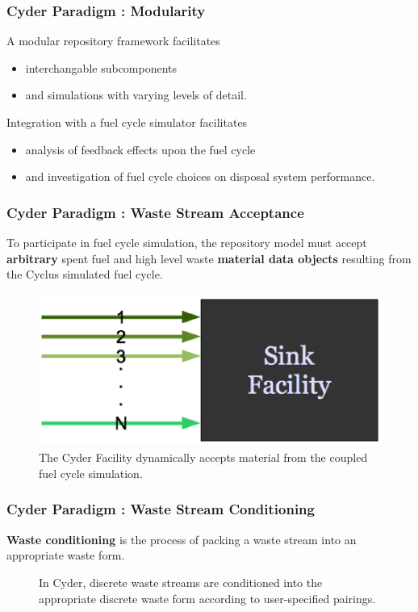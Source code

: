 
\begin{frame}[ctb!]
  \frametitle{Cyder Paradigm : Modularity }
  A modular repository framework facilitates 
  \begin{itemize}
    \item  interchangable subcomponents 
    \item and simulations with varying levels of detail.
  \end{itemize}
 \pause
  Integration with a fuel cycle simulator facilitates
  \begin{itemize}
    \item analysis of feedback effects upon the fuel cycle
    \item and investigation of fuel cycle choices on disposal system 
      performance.
  \end{itemize}
\end{frame}


\begin{frame}[ctb!]
  \frametitle{Cyder Paradigm : Waste Stream Acceptance}
To participate in fuel cycle simulation, the repository model must accept 
\textbf{arbitrary} spent fuel and high level waste \textbf{material data 
objects} resulting from the Cyclus simulated fuel cycle.  

  \begin{figure}[htbp!]
    \begin{center}
      \includegraphics[height=5cm]{./images/sinkfacility.eps}
    \end{center}
    \caption{ The Cyder Facility dynamically accepts material from the 
    coupled fuel cycle simulation.} 
    \label{fig:sinkfacility}
  \end{figure}
\end{frame}

\begin{frame}[ctb!]
  \frametitle{Cyder Paradigm : Waste Stream Conditioning}
  \footnotesize{

    \textbf{Waste conditioning} is the process of packing a waste stream into an appropriate 
waste form. 
  
\begin{figure}[htbp!]
\begin{center}
\def\svgwidth{.5\textwidth}

\end{center}
\caption{In Cyder, discrete waste streams are conditioned into the appropriate 
discrete waste form according to user-specified pairings.}
\label{fig:ws_conditioning}
\end{figure}
}
\end{frame}

